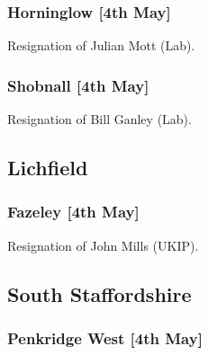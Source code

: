 \documentclass[a4paper,openany]{book}
\begin{document}
\begin{resultsiii}
\subsubsection*{Horninglow \hspace*{\fill}\nolinebreak[1]%
\enspace\hspace*{\fill}
[4th May]}


Resignation of Julian Mott (Lab).

\subsubsection*{Shobnall \hspace*{\fill}\nolinebreak[1]%
\enspace\hspace*{\fill}
[4th May]}


Resignation of Bill Ganley (Lab).

\subsection*{Lichfield}

\subsubsection*{Fazeley \hspace*{\fill}\nolinebreak[1]%
\enspace\hspace*{\fill}
[4th May]}


Resignation of John Mills (UKIP).

\subsection*{South Staffordshire}

\subsubsection*{Penkridge West \hspace*{\fill}\nolinebreak[1]%
\enspace\hspace*{\fill}
[4th May]}



\end{resultsiii}
\end{document}
